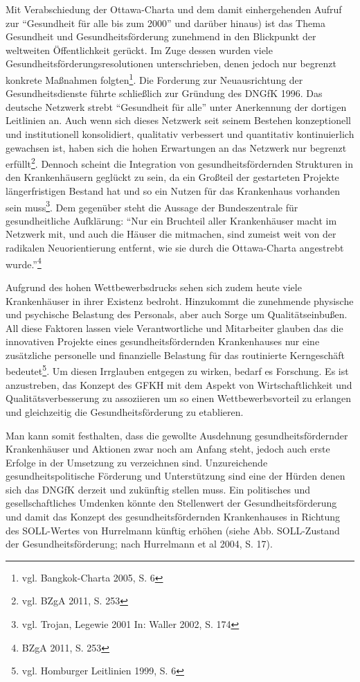 Mit Verabschiedung der Ottawa-Charta und dem damit einhergehenden Aufruf zur "`Gesundheit für alle bis zum 2000"' und darüber hinaus) ist das Thema Gesundheit und Gesundheitsförderung zunehmend in den Blickpunkt der weltweiten Öffentlichkeit gerückt. Im Zuge dessen wurden viele Gesundheitsförderungsresolutionen unterschrieben, denen jedoch nur begrenzt konkrete Maßnahmen folgten\footnote{vgl. Bangkok-Charta 2005, S. 6}. Die Forderung zur Neuausrichtung der Gesundheitsdienste führte schließlich zur Gründung des DNGfK 1996. Das deutsche Netzwerk strebt "`Gesundheit für alle"' unter Anerkennung der dortigen Leitlinien an. Auch wenn sich dieses Netzwerk seit seinem Bestehen konzeptionell und institutionell konsolidiert, qualitativ verbessert und quantitativ kontinuierlich gewachsen ist, haben sich die hohen Erwartungen an das Netzwerk nur begrenzt erfüllt\footnote{vgl. BZgA 2011, S. 253}. Dennoch scheint die Integration von gesundheitsfördernden Strukturen in den Krankenhäusern geglückt zu sein, da ein Großteil der gestarteten Projekte längerfristigen Bestand hat und so ein Nutzen für das Krankenhaus vorhanden sein muss\footnote{vgl. Trojan, Legewie 2001 In: Waller 2002, S. 174}. Dem gegenüber steht die Aussage der Bundeszentrale für gesundheitliche Aufklärung: "`Nur ein Bruchteil aller Krankenhäuser macht im Netzwerk mit, und auch die Häuser die mitmachen, sind zumeist weit von der radikalen Neuorientierung entfernt, wie sie durch die Ottawa-Charta angestrebt wurde."'\footnote{BZgA 2011, S. 253}

Aufgrund des hohen Wettbewerbsdrucks sehen sich zudem heute viele Krankenhäuser in ihrer Existenz bedroht. Hinzukommt die zunehmende physische und psychische Belastung des Personals, aber auch Sorge um Qualitätseinbußen. All diese Faktoren lassen viele Verantwortliche und Mitarbeiter glauben das die innovativen Projekte eines gesundheitsfördernden Krankenhauses nur eine zusätzliche personelle und finanzielle Belastung für das routinierte Kerngeschäft bedeutet\footnote{vgl. Homburger Leitlinien 1999, S. 6}. Um diesen Irrglauben entgegen zu wirken, bedarf es Forschung. Es ist anzustreben, das Konzept des GFKH mit dem Aspekt von Wirtschaftlichkeit und Qualitätsverbesserung zu assoziieren um so einen Wettbewerbsvorteil zu erlangen und gleichzeitig die Gesundheitsförderung zu etablieren.

Man kann somit festhalten, dass die gewollte Ausdehnung gesundheitsfördernder Krankenhäuser und Aktionen zwar noch am Anfang steht, jedoch auch erste Erfolge in der Umsetzung zu verzeichnen sind. Unzureichende gesundheitspolitische Förderung und Unterstützung sind eine der Hürden denen sich das DNGfK derzeit und zukünftig stellen muss. Ein politisches und gesellschaftliches Umdenken könnte den Stellenwert der Gesundheitsförderung und damit das Konzept des gesundheitsfördernden Krankenhauses in Richtung des SOLL-Wertes von Hurrelmann künftig erhöhen (siehe Abb. SOLL-Zustand der Gesundheitsförderung; nach Hurrelmann et al 2004, S. 17).

